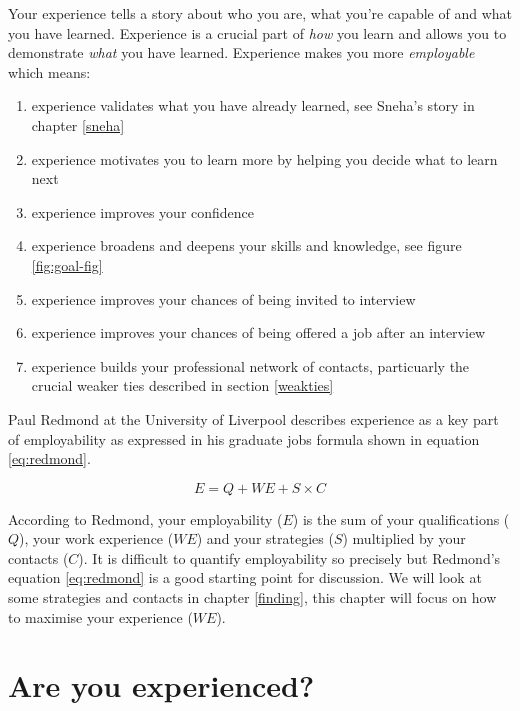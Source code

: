 \documentclass[
]{book}
\providecommand{\tightlist}{%
  \setlength{\itemsep}{0pt}\setlength{\parskip}{0pt}}
\begin{document}
Your experience tells a story about who you are, what you're capable of and what you have learned. Experience is a crucial part of \emph{how} you learn and allows you to demonstrate \emph{what} you have learned. Experience makes you more \emph{employable} which means:

\begin{enumerate}
\def\labelenumi{\arabic{enumi}.}
\tightlist
\item
  experience validates what you have already learned, see Sneha's story in chapter \ref{sneha}
\item
  experience motivates you to learn more by helping you decide what to learn next
\item
  experience improves your confidence \citep{jackiecarter}
\item
  experience broadens and deepens your skills and knowledge, see figure \ref{fig:goal-fig}
\item
  experience improves your chances of being invited to interview
\item
  experience improves your chances of being offered a job after an interview
\item
  experience builds your professional network of contacts, particuarly the crucial weaker ties described in section \ref{weakties}
\end{enumerate}

Paul Redmond at the University of Liverpool describes experience as a key part of employability \citep{paulredmond} as expressed in his graduate jobs formula shown in equation \eqref{eq:redmond}.

\begin{equation}
  E = Q + WE + S \times C
  \label{eq:redmond}
\end{equation}

According to Redmond, your employability (\(E\)) is the sum of your qualifications (\(Q\)), your work experience (\(WE\)) and your strategies (\(S\)) multiplied by your contacts (\(C\)). It is difficult to quantify employability so precisely but Redmond's equation \eqref{eq:redmond} is a good starting point for discussion. We will look at some strategies and contacts in chapter \ref{finding}, this chapter will focus on how to maximise your experience (\(WE\)).

\hypertarget{areuexperienced}{%
\section{Are you experienced?}\label{areuexperienced}}
\end{document}
